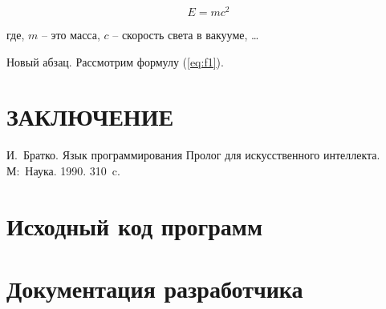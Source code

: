 \documentclass[14pt,final]{report}
\begin{document}
\begin{equation}
  \label{eq:f1}
  E=mc^2
\end{equation}

\noindent{}где, $m$ -- это масса, $c$ -- скорость света в вакууме, \ldots

Новый абзац. Рассмотрим формулу (\ref{eq:f1}).


\chapter*{ЗАКЛЮЧЕНИЕ}



\begin{thebibliography}{99}
 И.~Братко. Язык программирования Пролог для искусственного интеллекта. М\;:~Наука. 1990. 310~c.
\end{thebibliography}

\appendix

\chapter{Исходный код программ}
\chapter{Документация разработчика}
\end{document}

